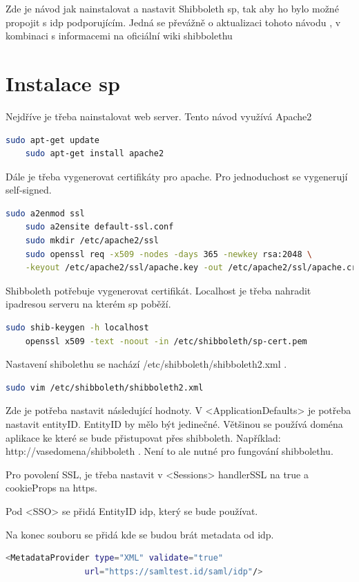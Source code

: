 Zde je návod jak nainstalovat a nastavit Shibboleth sp, tak aby ho bylo možné propojit s idp podporujícím. Jedná se převážně o aktualizaci tohoto návodu \cite{shibbolethSpInstallation}, v kombinaci s informacemi na oficiální wiki shibbolethu\cite{shibbolethWikiSP}

\section{Instalace sp}

Nejdříve je třeba nainstalovat web server. Tento návod využívá Apache2
\begin{lstlisting}[language=Bash]
    sudo apt-get update
    sudo apt-get install apache2
\end{lstlisting}

Dále je třeba vygenerovat certifikáty pro apache. Pro jednoduchost se vygenerují self-signed.
\begin{lstlisting}[language=Bash]
    sudo a2enmod ssl
    sudo a2ensite default-ssl.conf
    sudo mkdir /etc/apache2/ssl
    sudo openssl req -x509 -nodes -days 365 -newkey rsa:2048 \
    -keyout /etc/apache2/ssl/apache.key -out /etc/apache2/ssl/apache.crt
\end{lstlisting}

Shibboleth potřebuje vygenerovat certifikát. Localhost je třeba nahradit ipadresou serveru na kterém sp poběží.
\begin{lstlisting}[language=Bash]
    sudo shib-keygen -h localhost
    openssl x509 -text -noout -in /etc/shibboleth/sp-cert.pem
\end{lstlisting}

Nastavení shibolethu se nachází /etc/shibboleth/shibboleth2.xml .

\begin{lstlisting}[language=Bash]
   sudo vim /etc/shibboleth/shibboleth2.xml
\end{lstlisting}

Zde je potřeba nastavit následující hodnoty. V <ApplicationDefaults> je potřeba nastavit entityID. EntityID by mělo být jedinečné. Většinou se používá doména aplikace ke které se bude přistupovat přes shibboleth. Například: http://vasedomena/shibboleth . Není to ale nutné pro fungování shibbolethu.

Pro povolení SSL, je třeba nastavit v <Sessions>  handlerSSL na true a cookieProps na https.

Pod <SSO> se přidá EntityID idp, který se bude používat.

Na konec souboru se přidá kde se budou brát metadata od idp.
\begin{lstlisting}[language=Bash]
 <MetadataProvider type="XML" validate="true"
                url="https://samltest.id/saml/idp"/>
\end{lstlisting}

